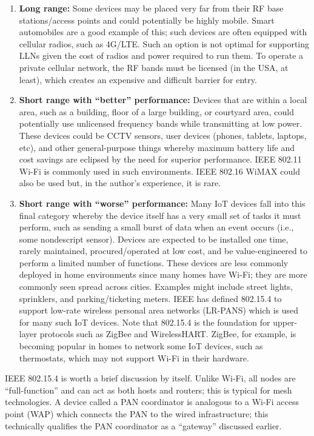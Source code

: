 \begin{enumerate}
  \begin{enumerate}
    \item \textbf{Long range:} Some devices may be placed very far from their RF base
	stations/access points and could potentially be highly mobile. Smart
	automobiles are a good example of this; such devices are often equipped with
	cellular radios, such as 4G/LTE. Such an option is not optimal for supporting
	LLNs given the cost of radios and power required to run them. To operate a
	private cellular network, the RF bands must be licensed (in the USA, at
	least), which creates an expensive and difficult barrier for entry.
    \item \textbf{Short range with ``better'' performance:} Devices that are within a
	local area, such as a building, floor of a large building, or courtyard area,
	could potentially use unlicensed frequency bands while transmitting at low
	power. These devices could be CCTV sensors, user devices (phones, tablets,
	laptops, etc), and other general-purpose things whereby maximum battery life
	and cost savings are eclipsed by the need for superior performance. IEEE
	802.11 Wi-Fi is commonly used in such environments. IEEE 802.16 WiMAX could
	also be used but, in the author’s experience, it is rare.
    \item \textbf{Short range with ``worse'' performance:} Many IoT devices
	fall into this final category whereby the device itself has a very small set
	of tasks it must perform, such as sending a small burst of data when an event
	occurs (i.e., some nondescript sensor). Devices are expected to be installed
	one time, rarely maintained, procured/operated at low cost, and be
	value-engineered to perform a limited number of functions. These devices are
	less commonly deployed in home environments since many homes have Wi-Fi; they
	are more commonly seen spread across cities. Examples might include street
	lights, sprinklers, and parking/ticketing meters. IEEE has defined 802.15.4
	to support low-rate wireless personal area networks (LR-PANS) which is used
	for many such IoT devices. Note that 802.15.4 is the foundation for
	upper-layer protocols such as ZigBee and WirelessHART. ZigBee, for example,
	is becoming popular in homes to network some IoT devices, such as
	thermostats, which may not support Wi-Fi in their hardware.
  \end{enumerate}
\end{enumerate}

IEEE 802.15.4 is worth a brief discussion by itself. Unlike Wi-Fi, all nodes
are ``full-function'' and can act as both hosts and routers; this is typical
for mesh technologies. A device called a PAN coordinator is analogous to a
Wi-Fi access point (WAP) which connects the PAN to the wired infrastructure;
this technically qualifies the PAN coordinator as a ``gateway'' discussed earlier.

